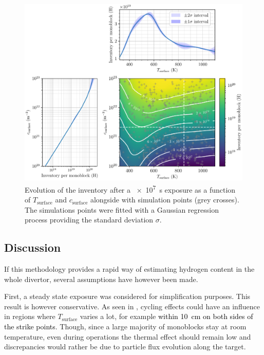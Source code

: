 \begin{figure} [h]
    \centering
    \includegraphics[width=\linewidth]{Figures/Chapter3/monoblocks/parametric_study/inventory_T_c_profiles.pdf}
    \caption{Evolution of the inventory after a \SI{e7}{s} exposure as a function of $T_\mathrm{surface}$ and $c_\mathrm{surface}$ alongside with simulation points (grey crosses). The simulations points were fitted with a Gaussian regression process \cite{chris_bowman_c-bowmaninference-tools_2020} providing the standard deviation $\sigma$.}
    \label{fig:inventory T c}
\end{figure}

\subsection{Discussion}
If this methodology provides a rapid way of estimating hydrogen content in the whole divertor, several assumptions have however been made.


First, a steady state exposure was considered for simplification purposes.
This result is however conservative.
As seen in , cycling effects could have an influence in regions where $T_\mathrm{surface}$ varies a lot, for example \textcolor{black}{within \SI{10}{cm} on both sides of the strike points}.
Though, since a large majority of monoblocks stay at room temperature, even during operations the thermal effect should remain low and discrepancies would rather be due to particle flux evolution along the target.

